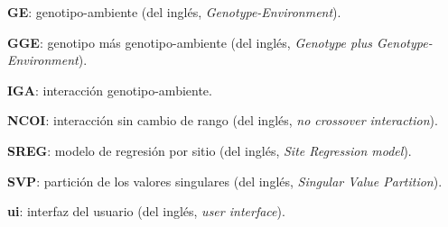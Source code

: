 \begin{description}
\item{\textbf{GE}}: genotipo-ambiente (del inglés, \emph{Genotype-Environment}).

\item{\textbf{GGE}}: genotipo más genotipo-ambiente (del inglés, \emph{Genotype plus Genotype-Environment}).

\item{\textbf{IGA}}: interacción genotipo-ambiente.

\item{\textbf{NCOI}}: interacción sin cambio de rango (del inglés, \emph{no crossover interaction}).

\item{\textbf{SREG}}: modelo de regresión por sitio (del inglés, \emph{Site Regression model}).

\item{\textbf{SVP}}: partición de los valores singulares (del inglés, \emph{Singular Value Partition}).

\item{\textbf{ui}}: interfaz del usuario (del inglés, \emph{user interface}).


\end{description}
